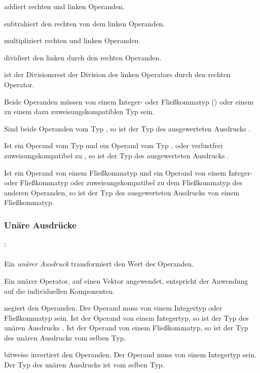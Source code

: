 \op{\plus} addiert rechten und linken Operanden.

\op{-} subtrahiert den rechten von dem linken Operanden.

\op{*} multipliziert rechten und linken Operanden.

\op{/} dividiert den linken durch den rechten Operanden.

\op{\%} ist der Divisionsrest der Division des linken Operators durch den rechten Operator.

Beide Operanden müssen von einem Integer- oder Fließkommatyp () oder einem
zu einem dazu zuweisungskompatiblen Typ sein.

Sind beide Operanden vom Typ , so ist der Typ des ausgewerteten Ausdrucks .

Ist ein Operand vom Typ  und ein Operand vom Typ ,  oder
verlustfrei zuweisungskompatibel zu , so ist der Typ des ausgewerteten Ausdrucks .

Ist ein Operand von einem Fließkommatyp und ein Operand von einem Integer- oder Fließkommatyp
oder zuweisungskompatibel zu dem Fließkommatyp des anderen Operanden,
so ist der Typ des ausgewerteten Ausdrucks von einem Fließkommatyp.


\subsubsection{Unäre Ausdrücke}\label{Unaere Ausdruecke}
:\label{asdr_unaer}\\
\hspace*{1cm}\Gopt{\Galt{\Gt{$\sim$}\Gor{}\Gt{-}\Gor{}\Gt{!}}}\Gspace{} \\

Ein \emph{unärer Ausdruck} transformiert den Wert des Operanden.

Ein unärer Operator, auf einen Vektor angewendet, entspricht der Anwendung auf die individuellen Komponenten.

\op{-} negiert den Operanden. Der Operand muss von einem Integertyp oder Fließkommatyp sein.
Ist der Operand von einem Integertyp, so ist der Typ des unären Ausdrucks .
Ist der Operand von einem Fließkommatyp, so ist der Typ des unären Ausdrucks vom selben Typ.

\op{$\sim$} bitweise invertiert den Operanden. Der Operand muss von einem Integertyp sein. Der Typ des unären Ausdrucks ist vom selben Typ.

